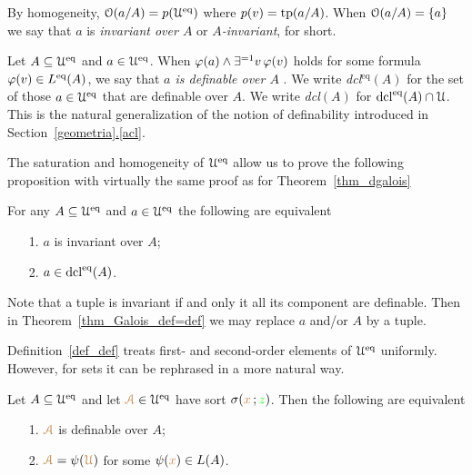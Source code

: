 \documentclass[creche.tex]{subfiles}
\begin{document}

By homogeneity, $\EuScript O(a/A)=p(\EuScript U^{{\rm eq}})$ where $p(v)={\rm tp}(a/A)$. When $\EuScript O(a/A)=\{a\}$ we say that $a$ is \emph{invariant over $A$\/} or \emph{$A$-invariant}, for short.


\begin{definition}\label{def_def}
Let $A\subseteq\EuScript U^{{\rm eq}}$ and $a\in\EuScript U^{{\rm eq}}$. When $\varphi(a)\wedge\exists^{=1}v\,\varphi(v)$ holds for some formula $\varphi(v)\in L^{{\rm eq}}(A)$, we say that \emph{$a$ is definable over $A$\/} . We write \emph{dcl$^\textrm{eq}(A)$\/} for the set of those $a\in\EuScript U^{{\rm eq}}$ that are definable over $A$. We write \emph{dcl$(A)$\/} for $\mathop{\rm dcl}^{{\rm eq}}(A)\cap\EuScript U$. This is the natural generalization of the notion of definability introduced in Section~\hyperref[acl]{\ref*{geometria}.\ref*{acl}}.\QED
\end{definition}

The saturation and homogeneity of $\EuScript U^{{\rm eq}}$ allow us to prove the following proposition with virtually the same proof as for Theorem~\ref{thm_dgalois}

\begin{theorem}\label{thm_Galois_def=def}
For any $A\subseteq\EuScript U^{{\rm eq}}$ and $a\in\EuScript U^{{\rm eq}}$ the following are equivalent
\begin{itemize}
\item[1.] $a$ is invariant over $A$;
\item[2.] $a\in\mathop{\rm dcl}^{{\rm eq}}(A)$.\QED
\end{itemize}
\end{theorem}

Note that a tuple is invariant if and only it all its component are definable. Then in Theorem~\ref{thm_Galois_def=def} we may replace $a$ and/or $A$ by a tuple.

Definition~\ref{def_def} treats first- and second-order elements of $\EuScript U^{{\rm eq}}$ uniformly. However, for sets it can be rephrased in a more natural way.

\begin{proposition}\label{prop_def_def_set}
Let $A\subseteq\EuScript U^{{\rm eq}}$ and let ${\color{brown}\EuScript A}\in\EuScript U^{{\rm eq}}$ have sort $\sigma({\color{brown} x}\,;{\color{green} z})$. Then the following are equivalent
\begin{itemize}
\item[1.] ${\color{brown}\EuScript A}$ is definable over $A$;
\item[2.] ${\color{brown}\EuScript A}=\psi({\color{brown}\EuScript U})$ for some $\psi({\color{brown} x})\in L(A)$.
\end{itemize}
\end{proposition}
\end{document}
